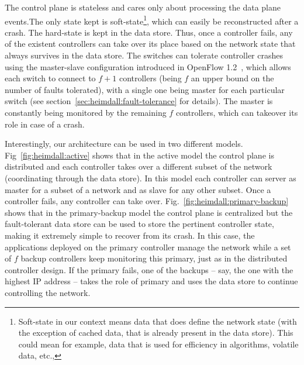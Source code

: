 The control plane is stateless and cares only about processing the data plane events.The only state kept is soft-state\footnote{Soft-state in our context means data that does define the network state (with the exception of cached data, that is already present in the data store). This could mean for example, data that is used for efficiency in algorithms, volatile data, etc.,}, which can easily be reconstructed after a crash. The hard-state is kept in the data store. 
Thus, once a controller fails, any of the existent controllers can take over its place based on the network state that always survives in the data store. 
The switches can tolerate controller crashes using the master-slave configuration introduced in OpenFlow 1.2~\cite{ONF2011}, which allows each switch to connect  to  $f+1$ controllers (being $f$ an upper bound on the number of faults tolerated), with a single one being master for each particular switch (see section~\ref{sec:heimdall:fault-tolerance} for details). 
The master is constantly being monitored by the remaining $f$ controllers, which can takeover its role in case of a crash.

Interestingly, our architecture can be used in two different models.  Fig~\ref{fig:heimdall:active} shows that in the active model the  control plane is distributed and each controller takes over a different subset of the network (coordinating through the data store). In this model each controller can server as master for a subset of a network and as slave for any other subset. Once a controller fails, any controller can take over.  
Fig.~\ref{fig:heimdall:primary-backup} shows that in the primary-backup model  the control plane is centralized but the fault-tolerant data store can be used to store the pertinent controller state, making it extremely simple to recover from its crash.
In this case, the applications deployed on the primary controller manage the network while a set of $f$ backup controllers keep monitoring this primary, just as in the distributed controller design.
If the primary fails, one of the backups -- say, the one with the highest IP address -- takes the role of primary and uses the data store to continue controlling the network.



